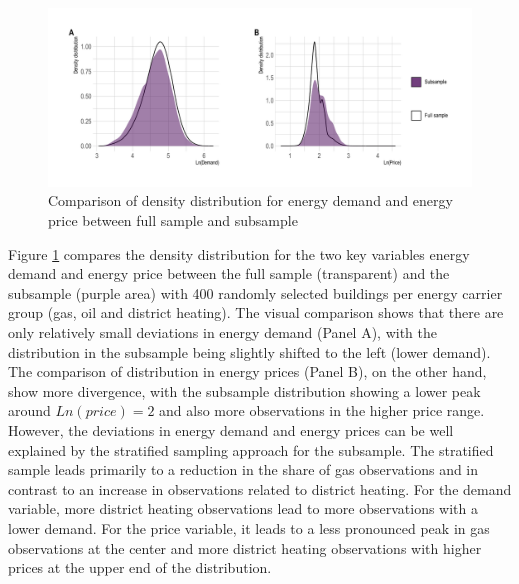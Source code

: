 \documentclass[12pt,twoside]{reedthesis}
\begin{document}
\newpage
\begin{figure}

{\centering \includegraphics[width=1\linewidth]{figure/density-distribution-comparison-samples} 

}

\caption{Comparison of density distribution for energy demand and energy price between full sample and subsample}\label{fig:density-distribution-comparison-samples}
\end{figure}
\noindent
Figure \ref{fig:density-distribution-comparison-samples} compares the density distribution for the two key variables energy demand and energy price between the full sample (transparent) and the subsample (purple area) with 400 randomly selected buildings per energy carrier group (gas, oil and district heating). The visual comparison shows that there are only relatively small deviations in energy demand (Panel A), with the distribution in the subsample being slightly shifted to the left (lower demand). The comparison of distribution in energy prices (Panel B), on the other hand, show more divergence, with the subsample distribution showing a lower peak around \(Ln(price) = 2\) and also more observations in the higher price range. However, the deviations in energy demand and energy prices can be well explained by the stratified sampling approach for the subsample. The stratified sample leads primarily to a reduction in the share of gas observations and in contrast to an increase in observations related to district heating. For the demand variable, more district heating observations lead to more observations with a lower demand. For the price variable, it leads to a less pronounced peak in gas observations at the center and more district heating observations with higher prices at the upper end of the distribution.

\newpage
\end{document}
